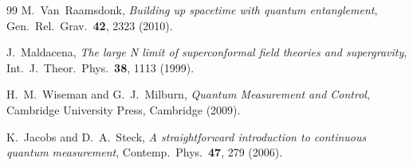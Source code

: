 \documentclass[12pt,a4paper]{article}
\theoremstyle{monette}
\theoremstyle{definition}
\begin{document}
\begin{thebibliography}{99}
M.~Van~Raamsdonk,
\textit{Building up spacetime with quantum entanglement},
Gen.\ Rel.\ Grav.\ \textbf{42}, 2323 (2010).

J.~Maldacena,
\textit{The large N limit of superconformal field theories and supergravity},
Int.\ J.\ Theor.\ Phys.\ \textbf{38}, 1113 (1999).

H.~M.~Wiseman and G.~J.~Milburn,
\textit{Quantum Measurement and Control},
Cambridge University Press, Cambridge (2009).

K.~Jacobs and D.~A.~Steck,
\textit{A straightforward introduction to continuous quantum measurement},
Contemp.\ Phys.\ \textbf{47}, 279 (2006).

\end{thebibliography}
\end{document}
